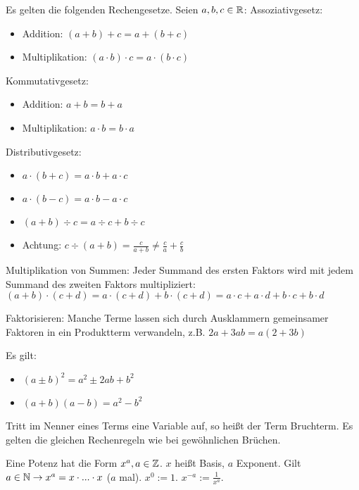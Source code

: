 \begin{satz}[Rechengesetze]
	Es gelten die folgenden Rechengesetze. Seien $a,b,c \in \mathbb{R}$:
	Assoziativgesetz:
	\begin{itemize}[noitemsep]
		\item Addition: $(a+b)+c = a + (b+c)$
		\item  Multiplikation: $(a \cdot b) \cdot c = a \cdot (b \cdot c)$
	\end{itemize}
	Kommutativgesetz:
	\begin{itemize}[noitemsep]
		\item Addition: $a + b = b + a$
		\item Multiplikation: $a \cdot b = b \cdot a $
	\end{itemize}
	Distributivgesetz:
	\begin{itemize}[noitemsep]
		\item $a \cdot (b + c) = a \cdot b + a \cdot c$
		\item $a \cdot (b - c) = a \cdot b - a \cdot c$
		\item $(a + b) \div c = a \div c + b \div c$
		\item Achtung: $c \div (a + b) = \frac{c}{a + b} \neq \frac{c}{a} + \frac{c}{b}$
	\end{itemize}
	Multiplikation von Summen: Jeder Summand des ersten Faktors wird mit jedem Summand des zweiten Faktors multipliziert: $(a + b) \cdot (c + d) = a \cdot (c + d) + b \cdot (c + d) = a \cdot c + a \cdot d + b \cdot c + b \cdot d$
	
	Faktorisieren: Manche Terme lassen sich durch Ausklammern gemeinsamer Faktoren in ein Produktterm verwandeln, z.B. $2a + 3ab = a(2 + 3b)$
\end{satz}

\begin{satz}
	Es gilt:
	\begin{itemize}[noitemsep]
		\item  $(a \pm b)^2 = a^2 \pm 2ab + b^2$
		\item  $(a+b)(a-b) = a^2 - b^2$
	\end{itemize}
\end{satz}

\begin{definition}[Bruchterme]
	Tritt im Nenner eines Terms eine Variable auf, so heißt der Term Bruchterm. Es gelten die gleichen Rechenregeln wie bei gewöhnlichen Brüchen.
\end{definition}

\begin{definition}[Potenz]
	Eine Potenz hat die Form $x^a, a \in \mathbb{Z}$. $x$ heißt Basis, $a$ Exponent. Gilt $a \in \mathbb{N} \rightarrow x^a = x \cdot ... \cdot x$ ($a$ mal). $x^0 := 1$. $x^{-a} := \frac{1}{x^a}$. 
\end{definition}


